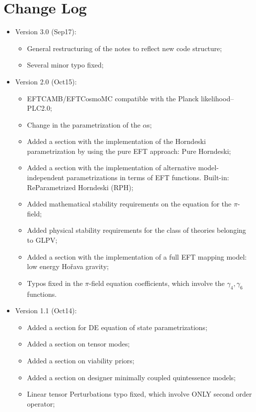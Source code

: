 \documentclass[prd,nofootinbib,showpacs]{revtex4}
\begin{document}
{\newpage 

\section*{Change Log}\label{Sec:ChangeLog}
%

\begin{itemize}
\item Version 3.0 (Sep17):
\begin{itemize}
\item General restructuring of the notes to reflect new code structure;
\item Several minor typo fixed;
\end{itemize}
\item Version 2.0 (Oct15):
\begin{itemize}
\item EFTCAMB/EFTCosmoMC compatible with the Planck likelihood--PLC2.0;
\item Change in the parametrization of the $\alpha$s;
\item Added a section with the implementation of the Horndeski parametrization by using the pure EFT approach: Pure Horndeski;
\item Added a section with the implementation of alternative model-independent parametrizations in terms of EFT functions. Built-in: ReParametrized Horndeski (RPH);
\item Added mathematical stability requirements on the equation for the $\pi$-field; 
\item Added physical stability requirements  for the class of theories belonging to GLPV;
\item Added a section with the implementation of a full EFT mapping model: low energy Ho\v rava gravity;
\item Typos fixed in the $\pi$-field equation coefficients, which involve the $\gamma_4, \gamma_6$ functions.
\end{itemize}
\item Version 1.1 (Oct14):
\begin{itemize}
\item Added a section for DE equation of state parametrizations;
\item Added a section on tensor modes;
\item Added a section on viability priors;
\item Added a section on designer minimally coupled quintessence models;
\item Linear tensor Perturbations typo fixed, which involve ONLY second order operator;

\end{itemize}
\end{itemize}}
\end{document}
